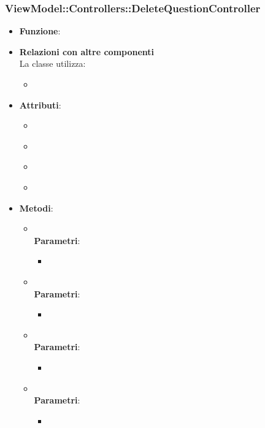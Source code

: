 \subsubsection{ViewModel::Controllers::DeleteQuestionController}
\begin{itemize}
\item\textbf{Funzione}:
\item\textbf{Relazioni con altre componenti}\\
La classe utilizza:
	\begin{itemize}
		\item
	\end{itemize}
\item\textbf{Attributi}:
	\begin{itemize}
		\item\code{}\\
		\item\code{}\\
		\item\code{}\\
		\item\code{}\\
	\end{itemize}
\item\textbf{Metodi}:
	\begin{itemize}
		\item\code{}\\
		\textbf{Parametri}:
			\begin{itemize}
				\item\code{}\\
			\end{itemize}
		\item\code{}\\
		\textbf{Parametri}:
			\begin{itemize}
				\item\code{}\\
			\end{itemize}
		\item\code{}\\
		\textbf{Parametri}:
			\begin{itemize}
				\item\code{}\\
			\end{itemize}
		\item\code{}\\
		\textbf{Parametri}:
			\begin{itemize}
				\item\code{}\\
			\end{itemize}
	\end{itemize}
\end{itemize}

